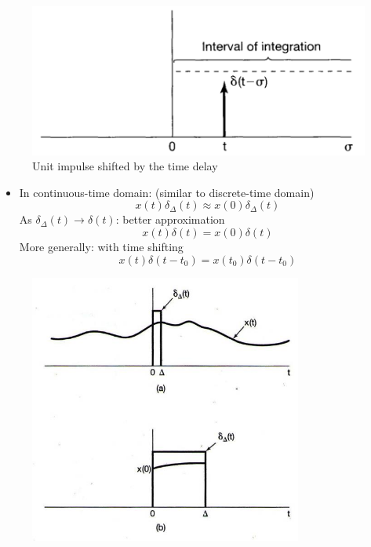 \documentclass[12pt,a4paper]{article}
\begin{document}
\begin{itemize}
\begin{figure}[H]
 \begin{minipage}[b]{0.45\linewidth} \centering \includegraphics[width=\linewidth]{images/6.7} \end{minipage}
 \caption{Unit impulse shifted by the time delay}
 \end{figure} \end{itemize}

 \begin{minipage}{0.5\textwidth}
 \begin{itemize}
\item In continuous-time domain: (similar to discrete-time domain)
\[ x(t)\delta_{\Delta}(t) \approx x(0)\delta_{\Delta}(t) \]
As $\delta_{\Delta}(t)\rightarrow \delta(t)$: better approximation
\[ x(t)\delta(t) = x(0)\delta(t) \]
More generally: with time shifting
\[ x(t)\delta(t-t_{0}) = x(t_{0})\delta(t-t_{0}) \] \end{itemize}
\end{minipage}\hfill
\begin{minipage}{0.5\textwidth} 
\begin{figure}[H]\centering \includegraphics[width=0.8\textwidth]{images/unitstepdelta}
  \caption{} \end{figure}
 \end{minipage}
 
\end{document}
